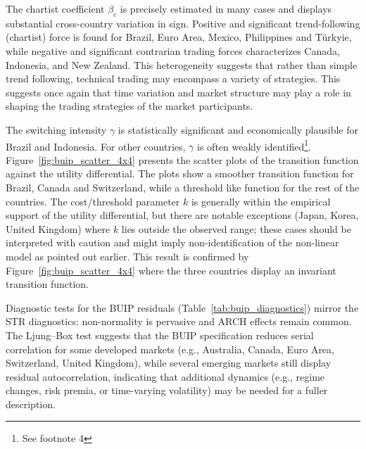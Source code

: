 \documentclass[a4paper,10pt,final]{article}    %
\begin{document}
The chartist coefficient $\beta_c$ is precisely estimated in many cases and displays substantial cross-country variation in sign. Positive and significant trend-following (chartist) force is found for Brazil, Euro Area, Mexico, Philippines and T\"urkyie, while negative and significant contrarian trading forces characterizes Canada, Indonesia, and New Zealand. This heterogeneity suggests that rather than simple trend following, technical trading may encompass a variety of strategies. This suggests once again that time variation and market structure may play a role in shaping the trading strategies of the market participants.

The switching intensity $\gamma$ is statistically significant and economically plausible for Brazil and Indonesia. For other countries, $\gamma$ is often weakly identified\footnote{See footnote 4}. Figure~\ref{fig:buip_scatter_4x4} presents the scatter plots of the transition function against the utility differential. The plots show a smoother transition function for Brazil, Canada and Switzerland, while a threshold like function for the rest of the countries.
The cost/threshold parameter $k$ is generally within the empirical support of the utility differential, but there are notable exceptions (Japan, Korea, United Kingdom) where $k$ lies outside the observed range; these cases should be interpreted with caution and might imply non-identification of the non-linear model as pointed out earlier. This result is confirmed by Figure~\ref{fig:buip_scatter_4x4} where the three countries display an invariant transition function.

Diagnostic tests for the BUIP residuals (Table~\ref{tab:buip_diagnostics}) mirror the STR diagnostics: non-normality is pervasive and ARCH effects remain common. The Ljung--Box test suggests that the BUIP specification reduces serial correlation for some developed markets (e.g., Australia, Canada, Euro Area, Switzerland, United Kingdom), while several emerging markets still display residual autocorrelation, indicating that additional dynamics (e.g., regime changes, risk premia, or time-varying volatility) may be needed for a fuller description.
\end{document}
